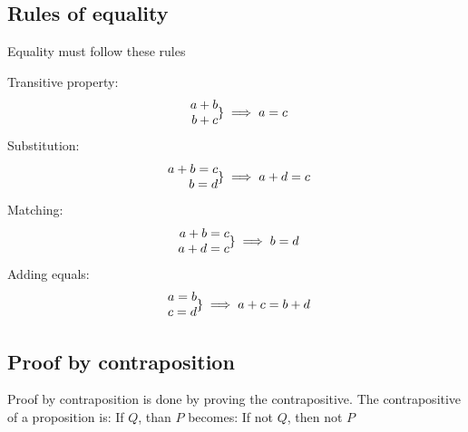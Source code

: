 \documentclass[a4paper,10pt]{report}
\begin{document}
\subsection{Rules of equality}
Equality must follow these rules
\begin{center}
	Transitive property:
	$$
		\begin{array}{r@{}l}
			a + b \\
			b + c
		\end{array}
		\rbrace \implies a = c
	$$
	Substitution:
	$$
		\begin{array}{r@{}l}
			a + b = c \\
			b = d
		\end{array}
		\rbrace \implies a + d = c
	$$
	Matching:
	$$
		\begin{array}{r@{}l}
			a + b  = c \\
			a + d = c
		\end{array}
		\rbrace \implies b = d
	$$
	Adding equals:
	$$
		\begin{array}{r@{}l}
			a = b \\
			c=d
		\end{array}
		\rbrace \implies a + c = b + d
	$$
\end{center}

\subsection{Proof by contraposition}
Proof by contraposition is done by proving the contrapositive.  The contrapositive of a proposition is:
If $Q$, than $P$ becomes: If not $Q$, then not $P$
\end{document}

